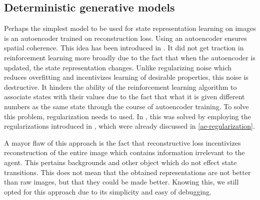 \subsection{Deterministic generative models}
Perhaps the simplest model to be used for state representation learning on images is 
an autoencoder trained on reconstruction loss.
Using an autoencoder ensures spatial coherence.
This idea has been introduced in \cite{lange2010deep}.
It did not get traction in reinforcement learning more broadly due to the fact
that when the autoencoder is updated, the state representation changes.
Unlike regularizing noise which reduces overfitting and incentivizes learning of
desirable properties, this noise is destructive. It hinders the ability 
of the reinforcement learning algorithm to associate states with their values
due to the fact that what it is given different numbers as the same state 
through the course of autoencoder training.
To solve this problem, regularization needs to used.
In \cite{sac+ae}, this was solved by employing the regularizations
introduced in \cite{ghosh2019variational}, which were already discussed in \ref{ae-regularization}.

A mayor flaw of this approach is the fact that reconstructive loss
incentivizes reconstruction of the entire image which contains information
irrelevant to the agent. This pertains backgrounds and other object which do not effect
state transitions. This does not mean that the obtained representations are not better
than raw images, but that they could be made better.
Knowing this, we still opted for this approach due to its simplicity and easy of debugging.

